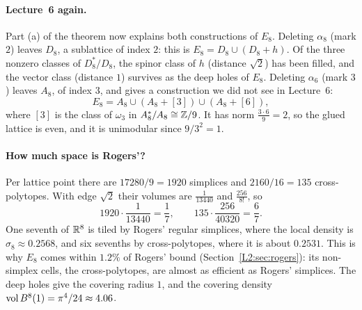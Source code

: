 \paragraph{Lecture~6 again.} Part (a) of the theorem now explains both constructions of $E_8$. Deleting
$\alpha_8$ (mark $2$) leaves $D_8$, a sublattice of index $2$: this is $E_8=D_8\cup(D_8+h)$. Of the three
nonzero classes of $D_8^*/D_8$, the spinor class of $h$ (distance $\sqrt2$) has been filled, and the vector
class (distance $1$) survives as the deep holes of $E_8$. Deleting $\alpha_6$ (mark $3$) leaves $A_8$, of
index $3$, and gives a construction we did not see in Lecture~6:
\[
  E_8=A_8\cup(A_8+[3])\cup(A_8+[6]),
\]
where $[3]$ is the class of $\omega_3$ in $A_8^*/A_8\cong\mathbb{Z}/9$. It has norm $\frac{3\cdot6}9=2$, so the
glued lattice is even, and it is unimodular since $9/3^2=1$.

\paragraph{How much space is Rogers'?} Per lattice point there are $17280/9=1920$ simplices and
$2160/16=135$ cross-polytopes. With edge $\sqrt2$ their volumes are $\frac1{13440}$ and $\frac{256}{8!}$, so
\[
  1920\cdot\frac1{13440}=\frac17,\qquad 135\cdot\frac{256}{40320}=\frac67 .
\]
One seventh of $\mathbb{R}^8$ is tiled by Rogers' regular simplices, where the local density is
$\sigma_8\approx0.2568$, and six sevenths by cross-polytopes, where it is about $0.2531$. This is why
$E_8$ comes within $1.2\%$ of Rogers' bound (Section~\ref{L2:sec:rogers}): its non-simplex cells,
the cross-polytopes, are almost as efficient as Rogers' simplices. The deep holes
give the covering radius $1$, and the covering density $\operatorname{vol}B^8(1)=\pi^4/24\approx4.06$.

